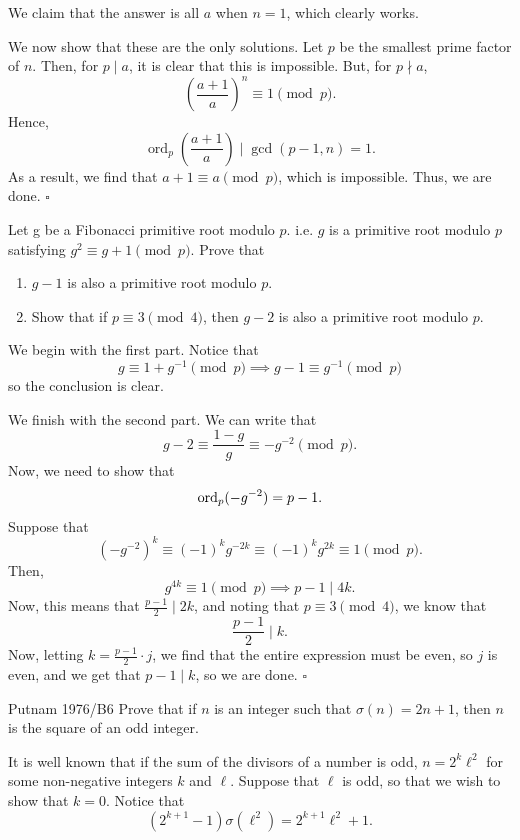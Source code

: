 \documentclass{article}
\begin{document}
We claim that the answer is all $a$ when $n = 1$, which clearly works.

We now show that these are the only solutions. Let $p$ be the smallest prime factor of $n$. Then, for $p \mid a$, it is clear that this is impossible. But, for $p \nmid a$, \[\left(\dfrac{a+1}{a}\right)^n \equiv 1 \pmod{p}.\] Hence, \[\operatorname{ord}_p\left(\dfrac{a+1}{a}\right) \mid \gcd(p-1, n) = 1.\] As a result, we find that $a+1 \equiv a \pmod{p}$, which is impossible. Thus, we are done. $\square$

\begin{problem}[5.9.8]{}
Let g be a Fibonacci primitive root modulo $p$. i.e. $g$ is a primitive root modulo $p$ satisfying $g^2 \equiv g+1 \pmod{p}$. Prove that
\begin{enumerate}
\item $g - 1$ is also a primitive root modulo $p$.
\item Show that if $p \equiv 3 \pmod{4}$, then $g - 2$ is also a primitive root modulo $p$.
\end{enumerate}
\end{problem}

We begin with the first part. Notice that \[g \equiv 1+g^{-1} \pmod{p} \implies g-1 \equiv g^{-1} \pmod{p}\] so the conclusion is clear.

We finish with the second part. We can write that \[g-2 \equiv \dfrac{1-g}{g} \equiv -g^{-2} \pmod{p}.\] Now, we need to show that \[\operatorname{ord}_p(-g^{-2}) = p-1.\] Suppose that \[(-g^{-2})^k \equiv (-1)^kg^{-2k}\equiv (-1)^kg^{2k} \equiv 1 \pmod{p}.\] Then, \[g^{4k} \equiv 1 \pmod{p} \implies p-1 \mid 4k.\] Now, this means that $\tfrac{p-1}{2} \mid 2k$, and noting that $p \equiv 3 \pmod{4}$, we know that \[\dfrac{p-1}{2} \mid k.\] Now, letting $k = \tfrac{p-1}{2}\cdot j$, we find that the entire expression must be even, so $j$ is even, and we get that $p-1 \mid k$, so we are done. $\square$

\begin{problem}[5.9.9]{Putnam 1976/B6}
Prove that if $n$ is an integer such that $\sigma(n) = 2n + 1$, then $n$ is the square of an odd integer.
\end{problem}

It is well known that if the sum of the divisors of a number is odd, $n = 2^k\ell^2$ for some non-negative integers $k$ and $\ell$. Suppose that $\ell$ is odd, so that we wish to show that $k = 0$. Notice that \[(2^{k+1}-1)\sigma(\ell^2) = 2^{k+1}\ell^2+1.\]
\end{document}
